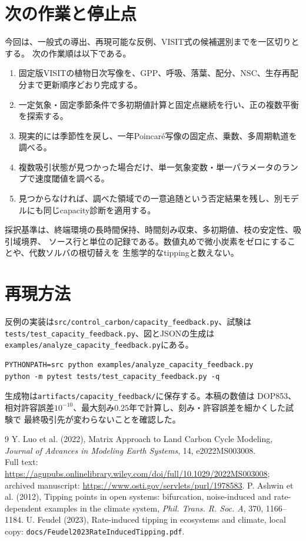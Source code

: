 \documentclass[a4paper,11pt]{ltjsarticle}
\newcommand{\code}[1]{\nolinkurl{#1}}
\begin{document}
\section{次の作業と停止点}
今回は、一般式の導出、再現可能な反例、VISIT式の候補選別までを一区切りとする。
次の作業順は以下である。
\begin{enumerate}
\item 固定版VISITの植物日次写像を、GPP、呼吸、落葉、配分、NSC、生存再配分まで更新順序どおり完成する。
\item 一定気象・固定季節条件で多初期値計算と固定点継続を行い、正の複数平衡を探索する。
\item 現実的には季節性を戻し、一年Poincar\'e写像の固定点、乗数、多周期軌道を調べる。
\item 複数吸引状態が見つかった場合だけ、単一気象変数・単一パラメータのランプで速度閾値を調べる。
\item 見つからなければ、調べた領域での一意追随という否定結果を残し、別モデルにも同じcapacity診断を適用する。
\end{enumerate}
採択基準は、終端環境の長時間保持、時間刻み収束、多初期値、枝の安定性、吸引域境界、
ソース行と単位の記録である。数値丸めで微小炭素をゼロにすることや、代数ソルバの根切替えを
生態学的なtippingと数えない。

\section{再現方法}
反例の実装は\code{src/control_carbon/capacity_feedback.py}、試験は
\code{tests/test_capacity_feedback.py}、図とJSONの生成は
\code{examples/analyze_capacity_feedback.py}にある。
\begin{verbatim}
PYTHONPATH=src python examples/analyze_capacity_feedback.py
python -m pytest tests/test_capacity_feedback.py -q
\end{verbatim}
生成物は\code{artifacts/capacity_feedback/}に保存する。本稿の数値は
DOP853、相対許容誤差$10^{-10}$、最大刻み$0.25$年で計算し、刻み・許容誤差を細かくした試験で
最終吸引先が変わらないことを確認した。

\begin{thebibliography}{9}
 Y. Luo et al. (2022), Matrix Approach to Land Carbon Cycle Modeling,
\emph{Journal of Advances in Modeling Earth Systems}, 14, e2022MS003008.\\
Full text: \url{https://agupubs.onlinelibrary.wiley.com/doi/full/10.1029/2022MS003008};
archived manuscript: \url{https://www.osti.gov/servlets/purl/1978583}.
 P. Ashwin et al. (2012), Tipping points in open systems:
bifurcation, noise-induced and rate-dependent examples in the climate system,
\emph{Phil. Trans. R. Soc. A}, 370, 1166--1184.
 U. Feudel (2023), Rate-induced tipping in ecosystems and climate,
local copy: \code{docs/Feudel2023RateInducedTipping.pdf}.
\end{thebibliography}
\end{document}
